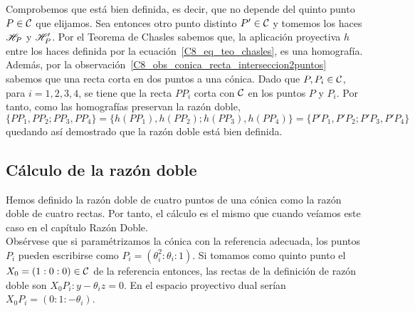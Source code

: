 Comprobemos que está bien definida, es decir, que no depende del quinto punto $P\in\mathcal{C}$ que elijamos. Sea entonces otro punto distinto $P'\in\mathcal{C}$ y tomemos los haces $\mathscr{H}_P$ y $\mathscr{H}_P'$. Por el Teorema de Chasles sabemos que, la aplicación proyectiva $h$ entre los haces definida por la ecuación~\eqref{C8_eq_teo_chasles}, es una homografía. Además, por la observación~\ref{C8_obs_conica_recta_interseccion2puntos} sabemos que una recta corta en dos puntos a una cónica. Dado que $P,P_i\in\mathcal{C}$, para $i=1,2,3,4$, se tiene que la recta $PP_i$ corta con $\mathcal{C}$ en los puntos $P$ y $P_i$. Por tanto, como las homografías preservan la razón doble,
\begin{equation}
	\{PP_1,PP_2;PP_3,PP_4\}=\{h(PP_1),h(PP_2);h(PP_3),h(PP_4)\}=\{P'P_1,P'P_2;P'P_3,P'P_4\}
\end{equation}
quedando así demostrado que la razón doble está bien definida.

\subsection{Cálculo de la razón doble}
Hemos definido la razón doble de cuatro puntos de una cónica como la razón doble de cuatro rectas. Por tanto, el cálculo es el mismo que cuando veíamos este caso en el capítulo Razón Doble.\\

Obsérvese que si paramétrizamos la cónica con la referencia adecuada, los puntos $P_i$ pueden escribirse como $P_i=(\theta_i^2:\theta_i:1)$. Si tomamos como quinto punto el $X_0=(1:0:0)\in\mathcal{C}$ de la referencia entonces, las rectas de la definición de razón doble son $X_0P_i:y-\theta_iz=0$. En el espacio proyectivo dual serían $X_0P_i=(0:1:-\theta_i)$. 

